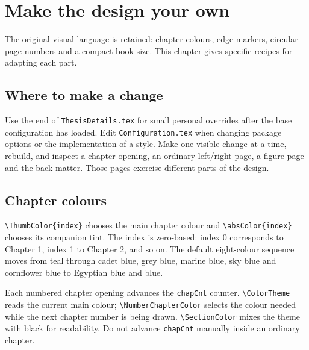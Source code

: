 
\chapter{Make the design your own}\label{chap:06}
\renewcommand{\FigLocation}{Chapters/Chapter_6/fig/}
\renewcommand{\ChapLocation}{Chapters/Chapter_6/}
\begin{absbox}
The original visual language is retained: chapter colours, edge markers, circular page numbers and a compact book size. This chapter gives specific recipes for adapting each part.
\end{absbox}

\section{Where to make a change}
Use the end of \texttt{ThesisDetails.tex} for small personal overrides after
the base configuration has loaded. Edit \texttt{Configuration.tex} when changing
package options or the implementation of a style. Make one visible change at a
time, rebuild, and inspect a chapter opening, an ordinary left/right page,
a figure page and the back matter. Those pages exercise different parts of
the design.

\section{Chapter colours}
\verb|\ThumbColor{index}| chooses the main chapter colour and
\verb|\absColor{index}| chooses its companion tint. The index is zero-based:
index 0 corresponds to Chapter 1, index 1 to Chapter 2, and so on. The default
eight-colour sequence moves from teal through cadet blue, grey blue, marine
blue, sky blue and cornflower blue to Egyptian blue and blue.

Each numbered chapter opening advances the \texttt{chapCnt} counter.
\verb|\ColorTheme| reads the current main colour;
\verb|\NumberChapterColor| selects the colour needed while the next chapter
number is being drawn. \verb|\SectionColor| mixes the theme with black for
readability. Do not advance \texttt{chapCnt} manually inside an ordinary chapter.

